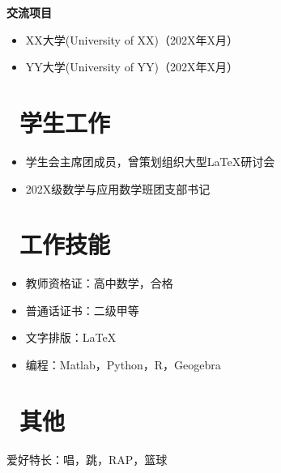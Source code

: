 \documentclass[11pt]{article}
\begin{document}
\textbf{交流项目}
\begin{itemize}
	\item XX大学(University of XX)（202X年X月）
	\item YY大学(University of YY)（202X年X月）
\end{itemize}

%
%

\section{\makebox[\widthof{\faGraduationCap}][c]{\color{CVBlue}\faUsers}\ 学生工作}
\begin{itemize}
	\item 学生会主席团成员，曾策划组织大型\LaTeX{}研讨会
	\item 202X级数学与应用数学班团支部书记
\end{itemize}

\section{\makebox[\widthof{\faGraduationCap}][c]{\color{CVBlue}\faWrench}\ 工作技能}

\begin{itemize}
	\item 教师资格证：高中数学，合格
	\item 普通话证书：二级甲等
	\item 文字排版：\LaTeX{}
	\item 编程：Matlab，Python，R，Geogebra

\end{itemize}

\section{\makebox[\widthof{\faGraduationCap}][c]{\color{CVBlue}\faTags}\ 其他}
爱好特长：唱，跳，RAP，篮球

\end{document}
